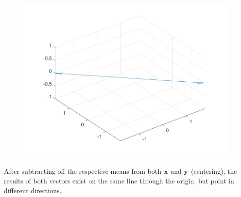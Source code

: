 \begin{enumerate}[font=\bfseries]
\begin{enumerate}
        \begin{figure}[H]
            \centering
            \includegraphics[scale=0.5]{./matlab/chapter-2/sol2.1c.png}
        \end{figure}

        After subtracting off the respective means from both $\bold{x}$ and $\bold{y}$ (centering), the results of both vectors exist on the same line through the origin, but point in different directions.
            

\end{enumerate}
\end{enumerate}
